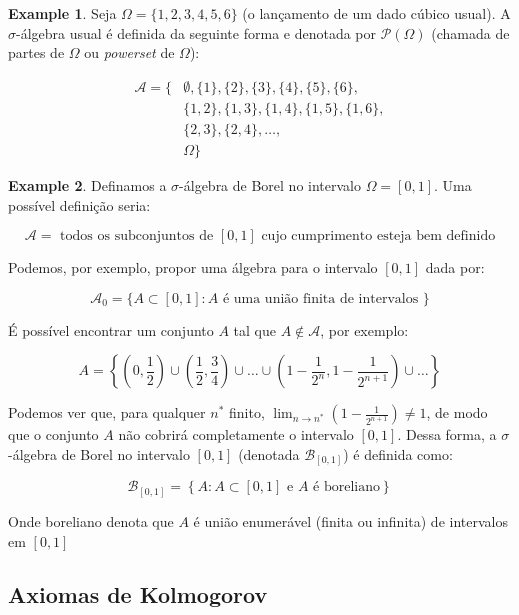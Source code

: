 \documentclass[
]{article}
\theoremstyle{definition}
\theoremstyle{definition}
\newtheorem{example}{Example}[section]
\theoremstyle{definition}
\theoremstyle{definition}
\theoremstyle{remark}
\begin{document}
\begin{example}
\protect\hypertarget{exm:powerset}{}\label{exm:powerset}Seja \(\Omega = \{1,2,3,4,5,6\}\) (o lançamento de um dado cúbico usual). A \(\sigma\)-álgebra usual é definida da seguinte forma e denotada por \(\mathcal{P}(\Omega)\) (chamada de partes de \(\Omega\) ou \emph{powerset} de \(\Omega\)):

\begin{align*}
\mathcal{A} = \{&\emptyset,\{1\},\{2\},\{3\},\{4\},\{5\},\{6\},\\
& \{1,2\},\{1,3\},\{1,4\},\{1,5\},\{1,6\}, \\
&\{2,3\},\{2,4\},\dots,\\
&\Omega\}
\end{align*}
\end{example}

\begin{example}
Definamos a \(\sigma\)-álgebra de Borel no intervalo \(\Omega = [0,1]\). Uma possível definição seria:

\[
\mathcal{A} = \text{ todos os subconjuntos de } [0,1] \text{ cujo cumprimento esteja bem definido}
\]

Podemos, por exemplo, propor uma álgebra para o intervalo \([0,1]\) dada por:

\[
\mathcal{A_{0}} = \{A \subset [0,1]: A \text{ é uma união finita de intervalos }\}
\]

É possível encontrar um conjunto \(A\) tal que \(A \not\in \mathcal{A}\), por exemplo:

\[
A = \left\{\left(0,\frac{1}{2}\right) \cup \left(\frac{1}{2},\frac{3}{4}\right)\cup \dots \cup \left(1-\frac{1}{2^{n}},1-\frac{1}{2^{n+1}}\right)\cup \dots\right\}
\]

Podemos ver que, para qualquer \(n^{*}\) finito, \(\lim_{n \to n^{*}}\left(1 - \frac{1}{2^{n+1}}\right) \neq 1\), de modo que o conjunto \(A\) não cobrirá completamente o intervalo \([0,1]\). Dessa forma, a \(\sigma\)-álgebra de Borel no intervalo \([0,1]\) (denotada \(\mathcal{B}_{[0,1]}\)) é definida como:

\[
\mathcal{B}_{[0,1]} = \left\{A: A \subset [0,1] \text{ e }A \text{ é boreliano}\right\}
\]

Onde boreliano denota que \(A\) é união enumerável (finita ou infinita) de intervalos em \([0,1]\)
\end{example}

\hypertarget{axiomas-de-kolmogorov}{%
\subsection{Axiomas de Kolmogorov}\label{axiomas-de-kolmogorov}}
\end{document}
